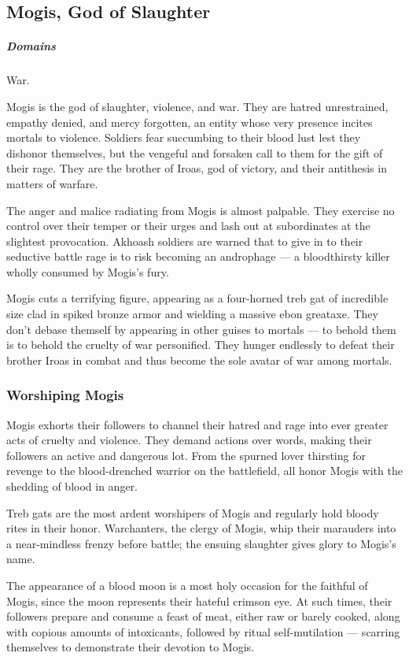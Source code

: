 \subsection*{Mogis, God of Slaughter} \label{ssec::mogis}
    \subparagraph{Domains} War.

    Mogis is the god of slaughter, violence, and war.
    They are hatred unrestrained, empathy denied, and mercy forgotten, an entity whose very presence incites mortals to violence.
    Soldiers fear succumbing to their blood lust lest they dishonor themselves, but the vengeful and forsaken call to them for the gift of their rage.
    They are the brother of Iroas, god of victory, and their antithesis in matters of warfare.

    The anger and malice radiating from Mogis is almost palpable.
    They exercise no control over their temper or their urges and lash out at subordinates at the slightest provocation.
    Akhoash soldiers are warned that to give in to their seductive battle rage is to risk becoming an androphage --- a bloodthirsty killer wholly consumed by Mogis's fury.

    Mogis cuts a terrifying figure, appearing as a four-horned treb gat of incredible size clad in spiked bronze armor and wielding a massive ebon greataxe.
    They don't debase themself by appearing in other guises to mortals --- to behold them is to behold the cruelty of war personified.
    They hunger endlessly to defeat their brother Iroas in combat and thus become the sole avatar of war among mortals.

    \subsubsection{Worshiping Mogis}
        Mogis exhorts their followers to channel their hatred and rage into ever greater acts of cruelty and violence.
        They demand actions over words, making their followers an active and dangerous lot.
        From the spurned lover thirsting for revenge to the blood-drenched warrior on the battlefield, all honor Mogis with the shedding of blood in anger.

        Treb gats are the most ardent worshipers of Mogis and regularly hold bloody rites in their honor.
        Warchanters, the clergy of Mogis, whip their marauders into a near-mindless frenzy before battle; the ensuing slaughter gives glory to Mogis's name.

        The appearance of a blood moon is a most holy occasion for the faithful of Mogis, since the moon represents their hateful crimson eye.
        At such times, their followers prepare and consume a feast of meat, either raw or barely cooked, along with copious amounts of intoxicants, followed by ritual self-mutilation --- scarring themselves to demonstrate their devotion to Mogis.

